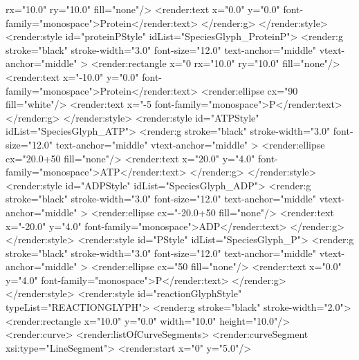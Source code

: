 {\begin{example}
                           rx="10.0" ry="10.0" fill="none"/>
         <render:text x="0.0" y="0.0" 
                      font-family="monospace">Protein</render:text>
        </render:g>
       </render:style>
       <render:style id="proteinPStyle" idList="SpeciesGlyph_ProteinP">
        <render:g stroke="black" stroke-width="3.0" font-size="12.0"
                  text-anchor="middle" vtext-anchor="middle" >
         <render:rectangle x="0%
                           rx="10.0" ry="10.0" fill="none"/>
         <render:text x="-10.0" y="0.0" 
                      font-family="monospace">Protein</render:text>
         <render:ellipse cx="90%
                         fill="white"/>
         <render:text x="-5%
                      font-family="monospace">P</render:text>
        </render:g>
       </render:style>
       <render:style id="ATPStyle" idList="SpeciesGlyph_ATP">
        <render:g stroke="black" stroke-width="3.0" font-size="12.0"
                  text-anchor="middle" vtext-anchor="middle" >
         <render:ellipse cx="20.0+50%
                         fill="none"/>
         <render:text x="20.0" y="4.0"
                      font-family="monospace">ATP</render:text>
        </render:g>
       </render:style>
       <render:style id="ADPStyle" idList="SpeciesGlyph_ADP">
        <render:g stroke="black" stroke-width="3.0" font-size="12.0"
                  text-anchor="middle" vtext-anchor="middle" >
         <render:ellipse cx="-20.0+50%
                         fill="none"/>
         <render:text x="-20.0" y="4.0"
                      font-family="monospace">ADP</render:text>
        </render:g>
       </render:style>
       <render:style id="PStyle" idList="SpeciesGlyph_P">
        <render:g stroke="black" stroke-width="3.0" font-size="12.0"
                  text-anchor="middle" vtext-anchor="middle" >
         <render:ellipse cx="50%
                         fill="none"/>
         <render:text x="0.0" y="4.0"
                      font-family="monospace">P</render:text>
        </render:g>
       </render:style>
       <render:style id="reactionGlyphStyle" typeList="REACTIONGLYPH">
        <render:g stroke="black" stroke-width="2.0">
         <render:rectangle x="10.0" y="0.0"
                           width="10.0" height="10.0"/>
         <render:curve>
          <render:listOfCurveSegments>
           <render:curveSegment xsi:type="LineSegment">
            <render:start x="0" y="5.0"/>

\end{example}}
